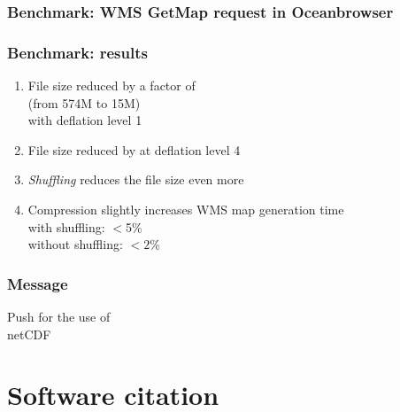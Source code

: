 
\begin{frame}
\frametitle{Benchmark: WMS ​GetMap request in Oceanbrowser}
\begin{figure}
\centering
\end{figure}

\end{frame}


\begin{frame}
\frametitle{Benchmark: results}
\begin{enumerate}
\item File size reduced by a factor of \\
(from 574M to 15M)\\
with deflation level 1
\item File size reduced by  at deflation level 4
\item \textit{Shuffling} reduces the file size even more
\item Compression slightly increases WMS map generation time\\
with shuffling: $<$5\%\\
without shuffling: $<2$\%
\end{enumerate}

\end{frame}


\begin{frame}
\frametitle{Message}
\huge
Push for the use of\\
netCDF
\end{frame}


\section{Software citation}
\begin{frame}[c]

\end{frame}



